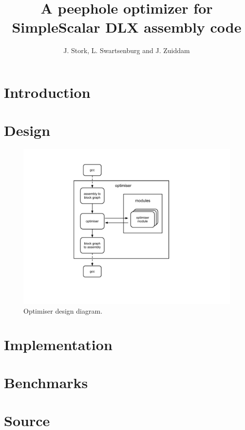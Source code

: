 \documentclass{scrreprt}
\title{A peephole optimizer for SimpleScalar DLX assembly code}
\author{J. Stork, L. Swartsenburg and J. Zuiddam}
\begin{document}
\maketitle
\chapter{Introduction}

\chapter{Design}

\begin{figure}[h]
\centering
\includegraphics[viewport= 170 90 510 490, clip=true]{diagram}
\caption{Optimiser design diagram.}
\label{fig:diagram}
\end{figure}

\chapter{Implementation}
\chapter{Benchmarks}
\appendix
\chapter{Source}
\end{document}
